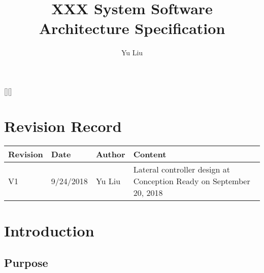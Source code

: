 \documentclass[11pt,letterpaper]{report}
\begin{document}
\newtheorem{lem}{\bf Lemma}%
\newtheorem{rem}{\bf Remark}%
\newtheorem{pro}{\bf Proposition}%
\newtheorem{defn}{\bf Definition}%
\newtheorem{thm}{\bf Theorem}%
\newtheorem{assu}{Assumption}%
\newcommand{\tr}{{\rm tr}}
\newcommand{\ts}{& \hspace{-0.05in}}
\newcommand{\nn}{\nonumber}
\newtheorem{ex}{Example}[section]
\newcommand{\bp}{\bigskip}
\newcommand{\slp}{\smallskip}
\newcommand{\diag}{{\rm diag}}
\newcommand{\sign}{{\rm sign}}

\newcommand{\rank}{{\rm rank}}
\newcommand{\qed}{\hfill \ensuremath{\Box}}

[][\FBwidth]



\title{\bf \LARGE XXX System Software Architecture Specification}

\author{Yu Liu}

\date{}
\maketitle


\chapter*{Revision Record}
\begin{table}[ht]
  \centering
  \begin{tabular}{|p{3cm}| p{3cm}| p{3cm}| p{7cm}|}
    \hline
    {\bf Revision}& {\bf Date}& {\bf Author}& {\bf Content} \\
    \hline
    V1      & 9/24/2018 & Yu Liu & Lateral controller design at
                                   Conception Ready on September 20,
                                   2018\\
    \hline
                                
  \end{tabular}
\end{table}


\newpage
\tableofcontents
\newpage


\chapter{Introduction}
\section{Purpose}
\end{document}
